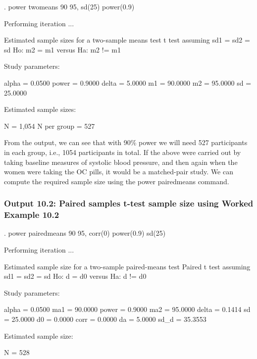\documentclass[
]{memoir}
\newenvironment{Shaded}{\begin{snugshade}}{\end{snugshade}}
\newcommand{\NormalTok}[1]{#1}
\begin{document}
\begin{Shaded}
\begin{Highlighting}[]
\NormalTok{. power twomeans 90 95, sd(25) power(0.9)}

\NormalTok{Performing iteration ...}

\NormalTok{Estimated sample sizes for a two{-}sample means test}
\NormalTok{t test assuming sd1 = sd2 = sd}
\NormalTok{Ho: m2 = m1 versus  Ha: m2 != m1}

\NormalTok{Study parameters:}

\NormalTok{        alpha =    0.0500}
\NormalTok{        power =    0.9000}
\NormalTok{        delta =    5.0000}
\NormalTok{           m1 =   90.0000}
\NormalTok{           m2 =   95.0000}
\NormalTok{           sd =   25.0000}

\NormalTok{Estimated sample sizes:}

\NormalTok{            N =     1,054}
\NormalTok{  N per group =       527}
\end{Highlighting}
\end{Shaded}

From the output, we can see that with 90\% power we will need 527 participants in each group, i.e., 1054 participants in total.
If the above were carried out by taking baseline measures of systolic blood pressure, and then again when the women were taking the OC pills, it would be a matched-pair study. We can compute the required sample size using the power pairedmeans command.

\hypertarget{output-10.2-paired-samples-t-test-sample-size-using-worked-example-10.2}{%
\subsubsection*{Output 10.2: Paired samples t-test sample size using Worked Example 10.2}\label{output-10.2-paired-samples-t-test-sample-size-using-worked-example-10.2}}

\begin{Shaded}
\begin{Highlighting}[]
\NormalTok{. power pairedmeans 90 95, corr(0) power(0.9) sd(25)}

\NormalTok{Performing iteration ...}

\NormalTok{Estimated sample size for a two{-}sample paired{-}means test}
\NormalTok{Paired t test assuming sd1 = sd2 = sd}
\NormalTok{Ho: d = d0  versus  Ha: d != d0}

\NormalTok{Study parameters:}

\NormalTok{        alpha =    0.0500          ma1 =   90.0000}
\NormalTok{        power =    0.9000          ma2 =   95.0000}
\NormalTok{        delta =    0.1414           sd =   25.0000}
\NormalTok{           d0 =    0.0000         corr =    0.0000}
\NormalTok{           da =    5.0000}
\NormalTok{         sd\_d =   35.3553}

\NormalTok{Estimated sample size:}

\NormalTok{            N =       528}
\end{Highlighting}
\end{Shaded}
\end{document}
